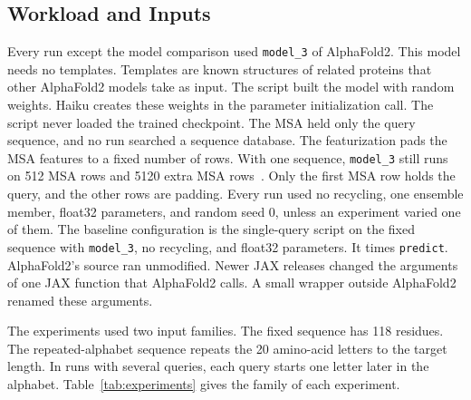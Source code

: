\subsection{Workload and Inputs}\label{sec:workload}
Every run except the model comparison used \texttt{model\_3} of AlphaFold2. This model needs no templates. Templates are known
structures of related proteins that other AlphaFold2 models take as input. The script built the model with random
weights. Haiku creates these weights in the parameter initialization call. The script never loaded the trained
checkpoint. The MSA held only the query sequence, and no run searched a sequence database. The featurization pads the
MSA features to a fixed number of rows.
With one sequence, \texttt{model\_3} still runs on 512 MSA rows and 5120 extra MSA rows~\cite{alphafoldrepo}. %
Only the first MSA row holds the query, and the other rows are padding.
Every run used no recycling, one ensemble member, float32 parameters, and random seed 0, unless an experiment varied one of them. %
The baseline configuration is the single-query script on the fixed sequence with \texttt{model\_3}, no recycling, and
float32 parameters. It times \texttt{predict}. AlphaFold2's source ran unmodified. Newer JAX releases changed the
arguments of one JAX function that AlphaFold2 calls. A small wrapper outside AlphaFold2 renamed these arguments.

The experiments used two input families. The fixed sequence has 118 residues. %
The repeated-alphabet sequence repeats the 20 amino-acid letters to the target length. %
In runs with several queries, each query starts one letter later in the alphabet. Table~\ref{tab:experiments} gives
the family of each experiment.

